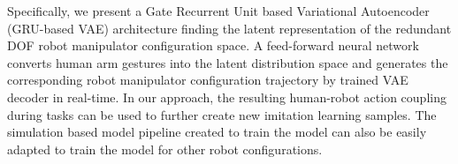 Specifically, we present a Gate Recurrent Unit based Variational Autoencoder (GRU-based VAE) architecture finding the latent representation of the redundant DOF robot manipulator configuration space. A feed-forward neural network converts human arm gestures into the latent distribution space and generates the corresponding robot manipulator configuration trajectory by trained VAE decoder in real-time. In our approach, the resulting human-robot action coupling during tasks can be used to further create new imitation learning samples. The simulation based model pipeline created to train the model can also be easily adapted to train the model for other robot configurations. 











